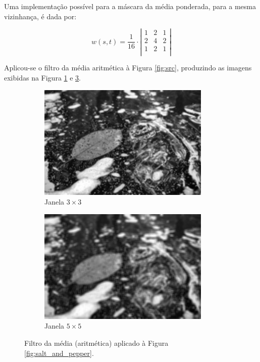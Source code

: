 \documentclass[10pt,a4paper]{article}
\begin{document}
Uma implementação possível para a máscara da média ponderada, para a mesma vizinhança, é dada por:

\[ w(s,t) = \frac{1}{16} \cdot \left|
    \begin{array}{ccc}
        1 & 2 & 1 \\
        2 & 4 & 2 \\
        1 & 2 & 1 \\
\end{array}\right|\]

Aplicou-se o filtro da média aritmética à Figura \ref{fig:src}, produzindo as imagens exibidas na Figura \ref{fig:avg_filter3} e \ref{fig:avg_filter5}.

\begin{figure}[!ht]
    \centering
    \begin{subfigure}[ht]{0.45\textwidth}
        \includegraphics[width=\textwidth]{dst_sp_avg3.jpg}
        \caption{Janela $3 \times 3$}
        \label{fig:avg_filter3}
    \end{subfigure}
    \qquad
    \begin{subfigure}[ht]{0.45\textwidth}
        \includegraphics[width=\textwidth]{dst_sp_avg5.jpg}
        \caption{Janela $5 \times 5$}
        \label{fig:avg_filter5}
    \end{subfigure}
    \caption{Filtro da média (aritmética) aplicado à Figura \ref{fig:salt_and_pepper}.}
\end{figure}
\end{document}
